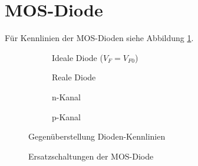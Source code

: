 \section{MOS-Diode}
Für Kennlinien der MOS-Dioden siehe Abbildung \ref{fig:diodenKennlinien}.
\begin{figure}[h]
	\centering
	\begin{subfigure}[b]{5cm}
		\centering
		\caption{Ideale Diode ($V_F = V_{F0}$)}
	\end{subfigure}
	\begin{subfigure}[b]{4cm}
		\centering
		\caption{Reale Diode}
	\end{subfigure} \quad
	\begin{subfigure}[b]{4cm}
		\centering
		\caption{n-Kanal}
	\end{subfigure}
	\begin{subfigure}[b]{4cm}
		\centering
		\caption{p-Kanal}
	\end{subfigure}
	\hspace{1.5cm}
	
	\begin{subfigure}[b]{4cm}
	\end{subfigure} \quad
	\begin{subfigure}[b]{4cm}
		\centering
	\end{subfigure} \qquad
	\begin{subfigure}[b]{8cm}
		\centering
	\end{subfigure}			
	\caption{Gegenüberstellung Dioden-Kennlinien}
	\label{fig:diodenKennlinien}
\end{figure}

\begin{figure}[h]
	\centering
	\begin{subfigure}[b]{5cm}
		\centering
	\end{subfigure} \qquad\qquad
	\begin{subfigure}[b]{3cm}
		\centering
	\end{subfigure}
	\caption{Ersatzschaltungen der MOS-Diode}
\end{figure}

